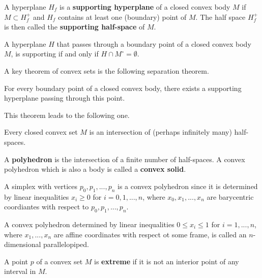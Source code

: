 \documentclass{article}
\begin{document}
    \begin{definition}
      A hyperplane $H_f$ is a \textbf{supporting hyperplane} of a closed convex body $M$ if $M \subset H^+_f$ and $H_f$ contains at least one (boundary) point of $M$. The half space $H^+_f$ is then called the \textbf{supporting half-space} of $M$. 
    \end{definition}

    \begin{proposition}
      A hyperplane $H$ that passes through a boundary point of a closed convex body $M$, is supporting if and only if $H \cap M^\circ = \emptyset$. 
    \end{proposition}

    A key theorem of convex sets is the following separation theorem. 

    \begin{theorem}
      For every boundary point of a closed convex body, there exists a supporting hyperplane passing through this point. 
    \end{theorem}

    This theorem leads to the following one. 

    \begin{theorem}
      Every closed convex set $M$ is an intersection of (perhaps infinitely many) half-spaces. 
    \end{theorem}

    \begin{definition}
      A \textbf{polyhedron} is the intersection of a finite number of half-spaces. A convex polyhedron which is also a body is called a \textbf{convex solid}. 
    \end{definition}

    \begin{example}
      A simplex with vertices $p_0, p_1, ..., p_n$ is a convex polyhedron since it is determined by linear inequalities $x_i \geq 0$ for $i = 0, 1, ..., n$, where $x_0, x_1, ..., x_n$ are barycentric coordiantes with respect to $p_0, p_1,..., p_n$. 
    \end{example}

    \begin{example}
      A convex polyhedron determined by linear inequalities $0 \leq x_i \leq 1$ for $i = 1, ..., n$, where $x_1,..., x_n$ are affine coordinates with respect ot some frame, is called an $n$-dimensional parallelopiped. 
    \end{example}

    \begin{definition}
      A point $p$ of a convex set $M$ is \textbf{extreme} if it is not an interior point of any interval in $M$. 
    \end{definition}
\end{document}

